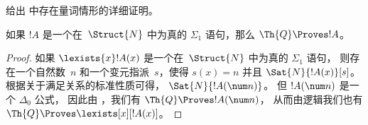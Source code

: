 \documentclass[../../../include/open-logic-section]{subfiles}
\begin{document}
\begin{prob}
给出  中存在量词情形的详细证明。
\end{prob}

\begin{thm}
如果 $!A$ 是一个在~$\Struct{N}$ 中为真的 $\Sigma_1$ 语句，那么 $\Th{Q} \Proves !A$。
\end{thm}

\begin{proof}
如果 $\lexists{x}!A(x)$ 是一个在~$\Struct{N}$ 中为真的 $\Sigma_1$ 语句，
则存在一个自然数~$n$ 和一个变元指派~$s$，使得 $s(x) = n$ 并且
$\Sat{N}{!A(x)}[s]$。
根据关于满足关系的标准性质可得，
$\Sat{N}{!A(\num n)}$。
但 $!A(\num n)$ 是一个 $\Delta_0$ 公式，
因此由 ，我们有
$\Th{Q} \Proves !A(\num n)$，
从而由逻辑我们也有
$\Th{Q} \Proves \lexists[x][!A(x)]$。
\end{proof}
\end{document}
